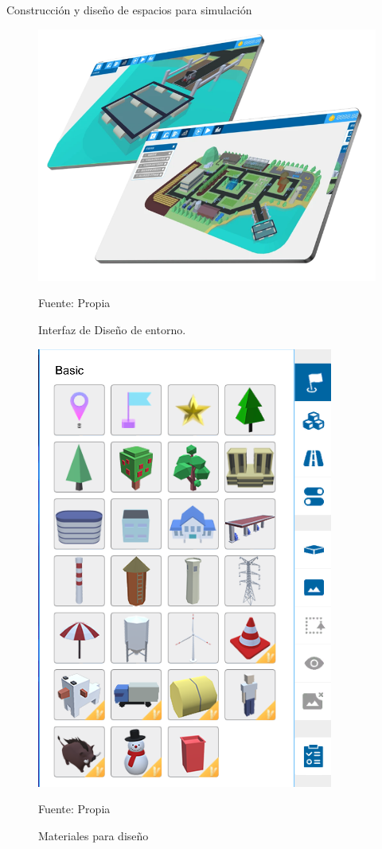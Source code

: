 Construcción y diseño de espacios para simulación

\begin{figure}[H]
    \centering
    \includegraphics[scale = 0.65]{Imagenes/diseno_entorno.png}
    \caption{Interfaz de Diseño de entorno.}{Fuente: Propia}
\end{figure}

\begin{figure}[H]
    \centering
    \includegraphics[scale = 0.75]{Imagenes/materiales.png}
    \caption{Materiales para diseño}{Fuente: Propia}
\end{figure}

